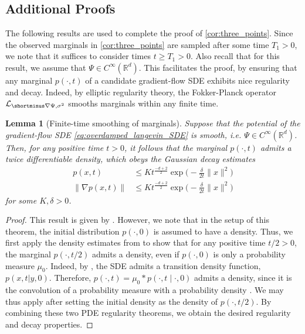 \documentclass[twoside]{article}
\newcommand{\R} {\mathbb R}
\newtheorem{lemma}[theorem]{Lemma}
\begin{document}
\subsection{Additional Proofs}
\label{sec:additional_proofs}

The following results are used to complete the proof of \cref{cor:three_points}. Since the observed marginals in \cref{cor:three_points} are sampled after some time $T_1 > 0$, we note that it suffices to consider times $t \ge T_1 > 0$. Also recall that for this result, we assume that $\Psi \in C^\infty(\R^d)$. This facilitates the proof, by ensuring that any marginal $p(\cdot,t)$ of a candidate gradient-flow SDE exhibits nice regularity and decay. Indeed, by elliptic regularity theory, the Fokker-Planck operator $\mathcal{L}_{\shortminus \nabla \Psi, \sigma^2}$ smooths marginals within any finite time.

\begin{lemma}[Finite-time smoothing of marginals] Suppose that the potential of the gradient-flow SDE \eqref{eq:overdamped_langevin_SDE} is smooth, i.e. $\Psi \in C^\infty(\R^d)$. Then, for any positive time $t>0$, it follows that the marginal $p(\cdot, t)$ admits a twice differentiable density, which obeys the Gaussian decay estimates
\begin{align*}
    p(x,t) &\le Kt^{\frac{-d+2}{2}} \exp\bigl(-\frac{\delta}{2t}\|x\|^2 \bigr)\\
    \|\nabla p(x, t)\|  &\le Kt^{\frac{-d+2}{2}} \exp\bigl(-\frac{\delta}{2t}\|x\|^2 \bigr)
\end{align*}
for some $K, \delta > 0$.
\label{lemma: PDE_regularity_finite_time}
\end{lemma}
\begin{proof}
This result is given by \citet[Theorem 4.1]{pavliotis2014stochastic}. However, we note that in the setup of this theorem, the initial distribution $p(\cdot, 0)$ is assumed to have a density. Thus, we first apply the density estimates from \citet[Theorem 1.2]{menozzi2021density} to show that for any positive time $t/2>0$, the marginal $p(\cdot,{t/2})$ admits a density, even if $p(\cdot,0)$ is only a probability measure $\mu_0$. Indeed, by \citet[Theorem 1.2]{menozzi2021density}, the SDE admits a  transition density function, $p(x,t|y,0)$. Therefore, $p(\cdot, t) = \mu_0 \ast p(\cdot,t \mid \cdot,0)$ admits a density, since it is the convolution of a probability measure with a probability density \citep[Theorem 2.1.16]{durrett2019probability}.
We may thus apply \citet[Theorem 4.1]{pavliotis2014stochastic} after setting the initial density as the density of $p(\cdot, t/2)$. By combining these two PDE regularity theorems, we obtain the desired regularity and decay properties.
\end{proof}
\end{document}
